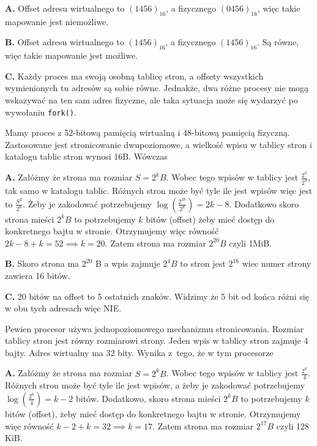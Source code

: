 \begin{solutions}
    \textbf{A.} Offset adresu wirtualnego to $(1456)_{16}$, a fizycznego $(0456)_{16}$, więc takie mapowanie jest niemożliwe.

    \textbf{B.} Offset adresu wirtualnego to $(1456)_{16}$, a fizycznego $(1456)_{16}$. Są równe, więc takie mapowanie jest możliwe.

    \textbf{C.} Każdy proces ma swoją osobną tablicę stron, a offsety wszystkich wymienionych tu adresów są sobie równe. Jednakże, dwa różne procesy nie mogą wskazywać na ten sam adres fizyczne, ale taka sytuacja może się wydarzyć po wywołaniu \texttt{fork()}.

    \sol Mamy proces z 52-bitową pamięcią wirtualną i 48-bitową pamięcią fizyczną. Zastosowane jest stronicowanie dwupoziomowe, a wielkość wpisu w tablicy stron i katalogu tablic stron wynosi 16B. Wówczas

    \textbf{A.} Załóżmy że strona ma rozmiar $S = 2^kB$. Wobec tego wpisów w tablicy jest $\frac{2^k}{2^4}$, tak samo w katalogu tablic. Różnych stron może być tyle ile jest wpisów więc jest to $\frac{S^2}{2^8}$. Żeby je zakodować potrzebujemy $\log(\frac{2^{2k}}{2^8}) = 2k - 8$. Dodatkowo skoro strona mieści $2^k B$ to potrzebujemy $k$ bitów (offset) żeby mieć dostęp do konkretnego bajtu w stronie. Otrzymujemy więc równość $2k - 8 + k = 52 \implies k = 20$. Zatem strona ma rozmiar $2^{20}B$ czyli 1MiB.

    \textbf{B.} Skoro strona ma $2^20$ B a wpis zajmuje $2^4B$ to stron jest $2^16$ wiec numer strony zawiera 16 bitów.

    \textbf{C.} 20 bitów na offset to 5 ostatnich znaków. Widzimy że 5 bit od końca różni się w obu tych adresach więc NIE.

    \sol Pewien procesor używa jednopoziomowego mechanizmu stronicowania. Rozmiar tablicy stron jest równy rozmiarowi strony. Jeden wpis w tablicy stron zajmuje 4 bajty. Adres wirtualny ma 32 bity. Wynika z~tego, że w tym procesorze

    \textbf{A.} Załóżmy że strona ma rozmiar $S = 2^kB$. Wobec tego wpisów w tablicy jest $\frac{2^k}{4}$. Różnych stron może być tyle ile jest wpisów, a żeby je zakodować potrzebujemy $\log(\frac{2^k}{4}) = k - 2$ bitów. Dodatkowo, skoro strona mieści $2^k B$ to potrzebujemy $k$ bitów (offset), żeby mieć dostęp do konkretnego bajtu w stronie. Otrzymujemy więc równość $k - 2 + k = 32 \implies k = 17$. Zatem strona ma rozmiar $2^{17}B$ czyli 128 KiB. 


\end{solutions}
